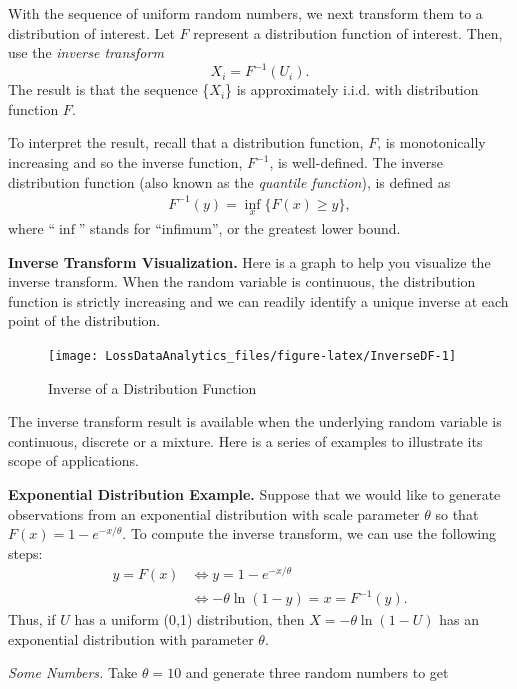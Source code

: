 \documentclass[]{book}
\theoremstyle{definition}
\theoremstyle{definition}
\theoremstyle{definition}
\theoremstyle{remark}
\begin{document}
With the sequence of uniform random numbers, we next transform them to a
distribution of interest. Let \(F\) represent a distribution function of
interest. Then, use the \emph{inverse transform}
\[X_i=F^{-1}\left( U_i \right) .\] The result is that the sequence
\{\(X_{i}\)\} is approximately i.i.d. with distribution function \(F\).

To interpret the result, recall that a distribution function, \(F\), is
monotonically increasing and so the inverse function, \(F^{-1}\), is
well-defined. The inverse distribution function (also known as the
\emph{quantile function}), is defined as \[\begin{aligned}
F^{-1}(y) = \inf_x \{ F(x) \ge y \} ,\end{aligned}\] where ``\(\inf\)''
stands for ``infimum'', or the greatest lower bound.

\textbf{Inverse Transform Visualization.} Here is a graph to help you
visualize the inverse transform. When the random variable is continuous,
the distribution function is strictly increasing and we can readily
identify a unique inverse at each point of the distribution.

\begin{figure}

{\centering \texttt{[image: LossDataAnalytics\_files/figure-latex/InverseDF-1]} 

}

\caption{Inverse of a Distribution Function}\label{fig:InverseDF}
\end{figure}

The inverse transform result is available when the underlying random
variable is continuous, discrete or a mixture. Here is a series of
examples to illustrate its scope of applications.

\textbf{Exponential Distribution Example.} Suppose that we would like to
generate observations from an exponential distribution with scale
parameter \(\theta\) so that \(F(x) = 1 - e^{-x/\theta}\). To compute
the inverse transform, we can use the following steps: \[\begin{aligned}
 y = F(x) &\Leftrightarrow  y = 1-e^{-x/\theta} \\
  &\Leftrightarrow -\theta \ln(1-y) = x = F^{-1}(y) .\end{aligned}\]
Thus, if \(U\) has a uniform (0,1) distribution, then
\(X = -\theta \ln(1-U)\) has an exponential distribution with parameter
\(\theta\).

\emph{Some Numbers.} Take \(\theta = 10\) and generate three random
numbers to get
\end{document}
